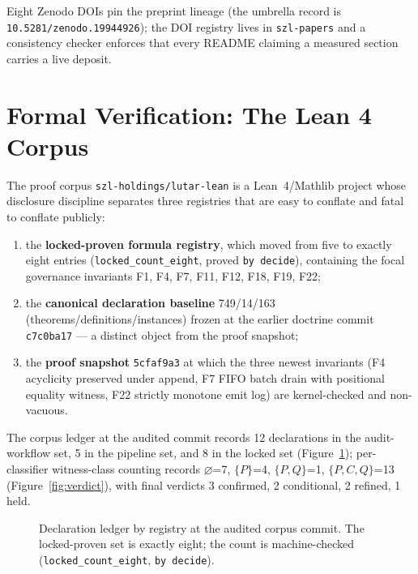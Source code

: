 Eight Zenodo DOIs pin the preprint lineage (the umbrella record is \texttt{10.5281/zenodo.19944926}); the DOI registry lives in \texttt{szl-papers} and a consistency checker enforces that every README claiming a measured section carries a live deposit.

\section{Formal Verification: The Lean 4 Corpus}
\label{sec:lean}

The proof corpus \texttt{szl-holdings/lutar-lean} is a Lean~4/Mathlib project whose disclosure discipline separates three registries that are easy to conflate and fatal to conflate publicly:
\begin{enumerate}
\item the \textbf{locked-proven formula registry}, which moved from five to exactly eight entries (\texttt{locked\_count\_eight}, proved \texttt{by decide}), containing the focal governance invariants F1, F4, F7, F11, F12, F18, F19, F22;
\item the \textbf{canonical declaration baseline} 749/14/163 (theorems/definitions/instances) frozen at the earlier doctrine commit \texttt{c7c0ba17} --- a distinct object from the proof snapshot;
\item the \textbf{proof snapshot} \texttt{5cfaf9a3} at which the three newest invariants (F4 acyclicity preserved under append, F7 FIFO batch drain with positional equality witness, F22 strictly monotone emit log) are kernel-checked and non-vacuous.
\end{enumerate}

The corpus ledger at the audited commit records 12 declarations in the audit-workflow set, 5 in the pipeline set, and 8 in the locked set (Figure~\ref{fig:ledger}); per-classifier witness-class counting records $\varnothing$=7, $\{P\}$=4, $\{P,Q\}$=1, $\{P,C,Q\}$=13 (Figure~\ref{fig:verdict}), with final verdicts 3 confirmed, 2 conditional, 2 refined, 1 held.

\begin{figure}[htbp]
\centering
{}
\caption{Declaration ledger by registry at the audited corpus commit. The locked-proven set is exactly eight; the count is machine-checked (\texttt{locked\_count\_eight}, \texttt{by decide}).}
\label{fig:ledger}
\end{figure}

